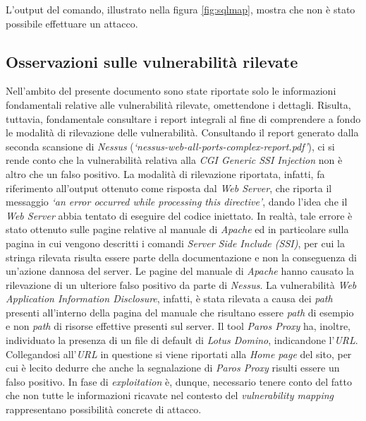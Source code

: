L'output del comando, illustrato nella figura \ref{fig:sqlmap}, mostra che non è stato possibile effettuare un attacco. 
\subsection{Osservazioni sulle vulnerabilità rilevate}
Nell'ambito del presente documento sono state riportate solo le informazioni fondamentali relative alle vulnerabilità rilevate, omettendone i dettagli. Risulta, tuttavia, fondamentale consultare i report integrali al fine di comprendere a fondo le modalità di rilevazione delle vulnerabilità. Consultando il report generato dalla seconda scansione di \emph{Nessus} (\emph{`nessus-web-all-ports-complex-report.pdf'}), ci si rende conto che la vulnerabilità relativa alla \emph{CGI Generic SSI Injection} non è altro che un falso positivo. La modalità di rilevazione riportata, infatti, fa riferimento all'output ottenuto come risposta dal \emph{Web Server}, che riporta il messaggio \emph{`an error occurred while processing this directive'}, dando l'idea che il \emph{Web Server} abbia tentato di eseguire del codice iniettato. In realtà, tale errore è stato ottenuto sulle pagine relative al manuale di \emph{Apache} ed in particolare sulla pagina in cui vengono descritti i comandi \emph{Server Side Include (SSI)}, per cui la stringa rilevata risulta essere parte della documentazione e non la conseguenza di un'azione dannosa del server. Le pagine del manuale di \emph{Apache} hanno causato la rilevazione di un ulteriore falso positivo da parte di \emph{Nessus}. La vulnerabilità \emph{Web Application Information Disclosure}, infatti, è stata rilevata a causa dei \emph{path} presenti all'interno della pagina del manuale che risultano essere \emph{path} di esempio e non \emph{path} di risorse effettive presenti sul server. Il tool \emph{Paros Proxy} ha, inoltre, individuato la presenza di un file di default di \emph{Lotus Domino}, indicandone l'\emph{URL}. Collegandosi all'\emph{URL} in questione si viene riportati alla \emph{Home page} del sito, per cui è lecito dedurre che anche la segnalazione di \emph{Paros Proxy} risulti essere un falso positivo. In fase di \emph{exploitation} è, dunque, necessario tenere conto del fatto che non tutte le informazioni ricavate nel contesto del \emph{vulnerability mapping} rappresentano possibilità concrete di attacco.